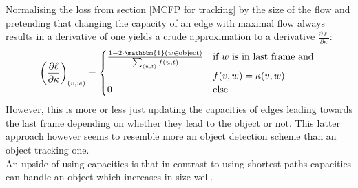 \documentclass{article}
\begin{document}
{Normalising the loss from section \ref{MCFP for tracking} by the size of the flow and pretending that changing the capacity of an edge with maximal flow always results in a derivative of one yields a crude approximation to a derivative $\frac{\partial \ell}{\partial \kappa}$:
\begin{align*}
\left(\frac{\partial \ell}{\partial \kappa}\right)_{(v,w)} = 
\begin{cases}
\frac{1 - 2 \cdot \mathbbm{1}(w\in \textnormal{object})}{\sum_{(u,t)} f(u,t)} &\textnormal{if } w \textnormal{ is in last frame and }\\
& f(v,w) = \kappa(v,w)\\
0 &\textnormal{else}
\end{cases}
\end{align*}
However, this is more or less just updating the capacities of edges leading towards the last frame depending on whether they lead to the object or not. This latter approach however seems to resemble more an object detection scheme than an object tracking one.\\
An upside of using capacities is that in contrast to using shortest paths capacities can handle an object which increases in size well.

}
\end{document}
